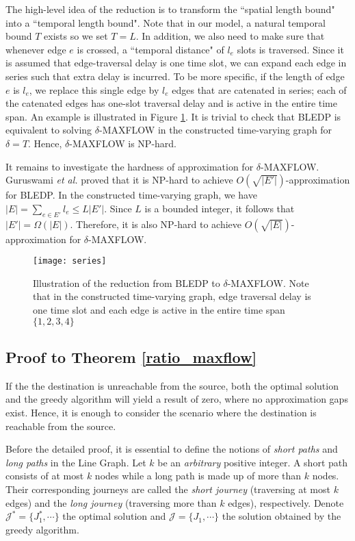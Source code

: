 \documentclass[10pt, conference, letterpaper]{IEEEtran}
\begin{document}
The high-level idea of the reduction is to transform the ``spatial length bound" into a ``temporal length bound". Note that in our model, a natural temporal bound $T$ exists so we set $T=L$. In addition, we also need to make sure that whenever  edge $e$ is crossed, a ``temporal distance" of $l_e$ slots is traversed. Since it is assumed that edge-traversal delay is one time slot, we can expand each edge in series such that extra delay is incurred. To be more specific, if the length of edge $e$ is $l_e$, we replace this single edge by $l_e$ edges that are catenated in series; each of the catenated edges has one-slot traversal delay and is active in the entire time span. An example is illustrated in Figure \ref{series}.  It is trivial to check that BLEDP is equivalent to solving $\delta$-MAXFLOW in the constructed time-varying graph for $\delta=T$. Hence, $\delta$-MAXFLOW is NP-hard.

It remains to investigate the hardness of approximation for $\delta$-MAXFLOW.  Guruswami \emph{et al.} \cite{hard} proved that it is NP-hard to achieve $O(\sqrt{|E'|})$-approximation for BLEDP. In the constructed time-varying graph, we have $|E|=\sum_{e\in E'}l_e\le L|E'|$. Since $L$ is a bounded integer,  it follows that $|E'|=\Omega(|E|)$. Therefore, it is also NP-hard to achieve $O(\sqrt{|E|})$-approximation for $\delta$-MAXFLOW.


\begin{figure}[tbp]
\begin{center}
\texttt{[image: series]}
\caption{Illustration of the reduction from BLEDP to $\delta$-MAXFLOW. Note that in the constructed time-varying graph, edge traversal delay is one time slot and each edge is active in the entire time span $\{1,2,3,4\}$}
\label{series}\vspace{-5mm}
\end{center}
\end{figure}
\subsection{Proof to Theorem \ref{ratio_maxflow}}\label{proof_ratio_maxflow}
If the the destination is unreachable from the source, both the optimal solution and the greedy algorithm will yield a result of zero, where no approximation gaps exist. Hence, it is enough to consider the scenario where the destination is reachable from the source.

Before the detailed proof, it is essential to define the notions of \emph{short paths} and \emph{long paths} in the Line Graph. Let $k$ be an \emph{arbitrary} positive integer. A short path consists of at most $k$ nodes while a long path is made up of more than $k$ nodes. Their corresponding journeys are called the \emph{short journey} (traversing at most $k$ edges) and the \emph{long journey} (traversing more than $k$ edges), respectively. Denote $\mathcal{J}^*=\{J^*_1,\cdots\}$ the optimal solution and $\mathcal{J}=\{J_1,\cdots\}$ the solution obtained by the greedy algorithm.
\end{document}
